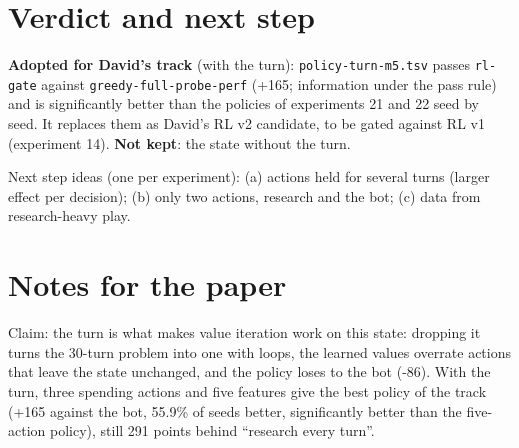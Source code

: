 \documentclass{../polyexp}
\begin{document}
\section{Verdict and next step}
\textbf{Adopted for David's track} (with the turn): \texttt{policy-turn-m5.tsv} passes \texttt{rl-gate} against
\texttt{greedy-full-probe-perf} (+165; information under the pass rule) and is significantly better than the
policies of experiments 21 and 22 seed by seed. It replaces them as David's RL v2 candidate, to be gated against RL
v1 (experiment 14). \textbf{Not kept}: the state without the turn.

Next step ideas (one per experiment): (a) actions held for several turns (larger effect per decision); (b) only two
actions, research and the bot; (c) data from research-heavy play.

\section{Notes for the paper}
Claim: the turn is what makes value iteration work on this state: dropping it turns the 30-turn problem into one
with loops, the learned values overrate actions that leave the state unchanged, and the policy loses to the bot
(-86). With the turn, three spending actions and five features give the best policy of the track (+165 against the
bot, 55.9\% of seeds better, significantly better than the five-action policy), still 291 points behind ``research
every turn''.

\end{document}
